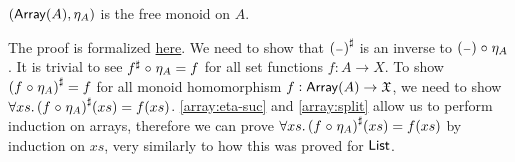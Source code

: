 \begin{propositionrep}\label{array:univ}
    $(\operatorname{\mathsf{Array}}(A),\eta_A)$ is the free monoid on $A$.
\end{propositionrep}

\begin{proofsketch}
    The proof is formalized \href{https://windtfw.com/agda-symmetries/Cubical.Structures.Set.Mon.Array.html#18935}{here}.
    We need to show that ${({\scriptstyle{-}})}^{\sharp}$ is an inverse to $({\scriptstyle{-}}) \mathrel{\circ} \eta_A$.
    It is trivial to see ${f}^{\sharp} \mathrel{\circ} \eta_A = f$ for all set functions $f : A \to X$.
    To show ${(f \mathrel{\circ} \eta_A)}^{\sharp} = f$ for all monoid homomorphism $f : \operatorname{\mathsf{Array}}(A) \to \mathfrak{X}$,
    we need to show $\forall xs.\, {(f \mathrel{\circ} \eta_A)}^{\sharp}(xs) = f(xs)$.
    \cref{array:eta-suc} and \cref{array:split} allow us to perform induction on arrays,
    therefore we can prove $\forall xs.\, {(f \mathrel{\circ} \eta_A)}^{\sharp}(xs) = f(xs)$ by induction on $xs$,
    very similarly to how this was proved for $\operatorname{\mathsf{List}}$.
\end{proofsketch}

